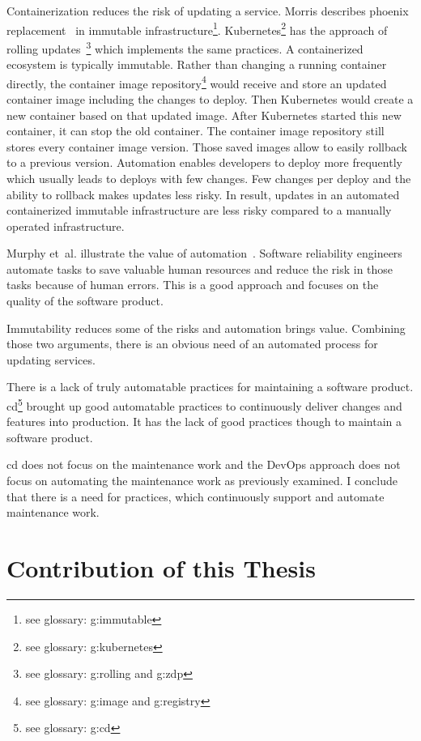 Containerization reduces the risk of updating a service. Morris describes phoenix
replacement~\cite{infra_as_code_phoenix} in immutable infrastructure\footnote{see
  glossary: \gls{g:immutable}}. Kubernetes\footnote{see glossary: \gls{g:kubernetes}} has
the approach of rolling updates~\footnote{see glossary: \gls{g:rolling} and \gls{g:zdp}}
which implements the same practices. A containerized ecosystem is typically
immutable. Rather than changing a running container directly, the container image
repository\footnote{see glossary: \gls{g:image} and \gls{g:registry}} would receive and
store an updated container image including the changes to deploy. Then Kubernetes would
create a new container based on that updated image. After Kubernetes started this new
container, it can stop the old container. The container image repository still stores
every container image version. Those saved images allow to easily rollback to a previous
version. Automation enables developers to deploy more frequently which usually leads to
deploys with few changes. Few changes per deploy and the ability to rollback makes updates
less risky. In result, updates in an automated containerized immutable infrastructure are
less risky compared to a manually operated infrastructure.

Murphy et~al. illustrate the value of automation~\cite{sre_automation}. Software
reliability engineers automate tasks to save valuable human resources and
reduce the risk in those tasks because of human errors. This is a good approach and
focuses on the quality of the software product.

Immutability reduces some of the risks and automation brings value. Combining those two
arguments, there is an obvious need of an automated process for updating services.

There is a lack of truly automatable practices for maintaining a software
product. \gls{cd}\footnote{see glossary: \gls{g:cd}} brought up good automatable practices
to continuously deliver changes and features into production. It has the lack of good
practices though to maintain a software product.

\gls{cd} does not focus on the maintenance work and the DevOps approach does not focus on
automating the maintenance work as previously examined. I conclude that there is a need
for practices, which continuously support and automate maintenance work.

\section{Contribution of this Thesis}

